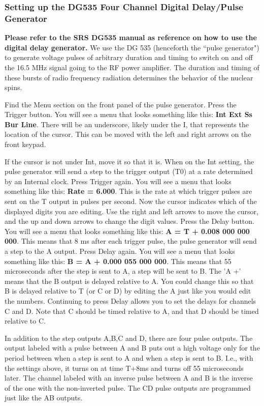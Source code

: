 \documentclass{../lab}
\begin{document}
\subsubsection{Setting up the DG535 Four Channel Digital Delay/Pulse Generator}
\textbf{Please refer to the SRS DG535 manual as reference on how to use the digital delay generator.}
We use the DG 535 (henceforth the ``pulse generator") to generate voltage pulses of arbitrary duration and timing to switch on and off the 16.5 MHz signal going to the RF power amplifier. The duration and timing of these bursts of radio frequency radiation determines the behavior of the nuclear spins. 

Find the Menu section on the front panel of the pulse generator. Press the Trigger button. You will see a menu that looks something like this: \textbf{Int Ext Ss Bur Line}. There will be an underscore, likely under the I,  that represents the location of the cursor. This can be moved with the left and right arrows on the front keypad. 

If the cursor is not under Int, move it so that it is. When on the Int setting, the pulse generator will send a step to the trigger output (T0) at a rate determined by an Internal clock. Press Trigger again. You will see a menu that looks something like this: \textbf{Rate = 6.000}. This is the rate at which trigger pulses are sent on the T output in pulses per second. Now the cursor indicates which of the displayed digits you are editing. Use the right and left arrows to move the cursor, and the up and down arrows to change the digit values. Press the Delay button. You will see a menu that looks something like this: \textbf{A = T + 0.008 000 000 000}. This means that 8 ms after each trigger pulse, the pulse generator will send a step to the A output. Press Delay again. You will see a menu that looks something like this: \textbf{B = A + 0.000 055 000 000}. This means that 55 microseconds after the step is sent to A, a step will be sent to B. The 'A +' means that the B output is delayed relative to A. You could change this so that B is delayed relative to T (or C or D) by editing the A just like you would edit the numbers. Continuing to press Delay allows you to set the delays for channels C and D. Note that C should be timed relative to A, and that D should be timed relative to C.

In addition to the step outputs A,B,C and D, there are four pulse outputs. The output labeled with a pulse between A and B puts out a high voltage only for the period between when a step is sent to A and when a step is sent to B. I.e., with the settings above, it turns on at time T+8ms and turns off 55 microseconds later. The channel labeled with an inverse pulse between A and B is the inverse of the one with the non-inverted pulse. The CD pulse outputs are programmed just like the AB outputs. 
\end{document}
